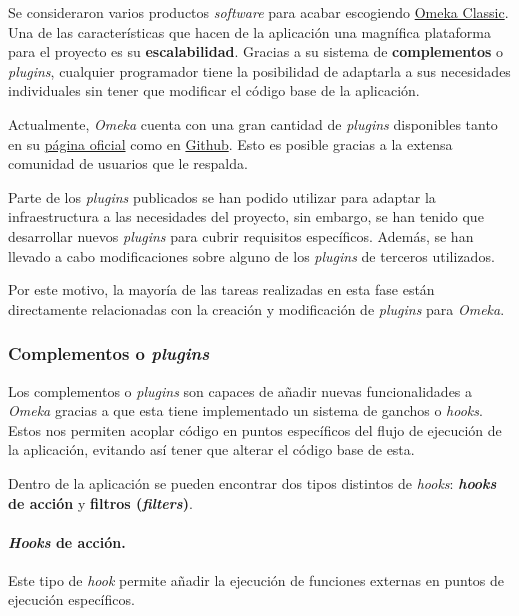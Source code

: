 Se consideraron varios productos \emph{software} para acabar escogiendo
\href{https://omeka.org/classic/}{Omeka Classic}. Una de las
características que hacen de la aplicación una magnífica plataforma para
el proyecto es su \textbf{escalabilidad}. Gracias a su sistema de
\textbf{complementos} o \emph{plugins}, cualquier programador tiene la
posibilidad de adaptarla a sus necesidades individuales sin tener que
modificar el código base de la aplicación.

Actualmente, \emph{Omeka} cuenta con una gran cantidad de \emph{plugins}
disponibles tanto en su \href{https://omeka.org/classic/plugins/}{página
oficial} como en
\href{https://daniel-km.github.io/UpgradeToOmekaS/omeka_plugins.html}{Github}.
Esto es posible gracias a la extensa comunidad de usuarios que le
respalda. 

Parte de los \emph{plugins} publicados se han podido utilizar para
adaptar la infraestructura a las necesidades del proyecto, sin embargo,
se han tenido que desarrollar nuevos \emph{plugins} para cubrir
requisitos específicos. Además, se han llevado a cabo modificaciones
sobre alguno de los \emph{plugins} de terceros utilizados.

Por este motivo, la mayoría de las tareas realizadas en esta fase están directamente
relacionadas con la creación y modificación de \emph{plugins} para \emph{Omeka}.

\subsubsection{Complementos o \emph{plugins}}

Los complementos o \emph{plugins} son capaces de añadir nuevas
funcionalidades a \emph{Omeka} gracias a que esta tiene implementado un
sistema de ganchos o \emph{hooks}. Estos nos permiten acoplar código en
puntos específicos del flujo de ejecución de la aplicación, evitando así
tener que alterar el código base de esta.

Dentro de la aplicación se pueden encontrar dos tipos distintos de
\emph{hooks}: \textbf{\emph{hooks} de acción} y \textbf{filtros (\emph{filters})}.


\paragraph{\emph{Hooks} de acción.}

Este tipo de \emph{hook} permite añadir la ejecución de funciones externas en
puntos de ejecución específicos.

